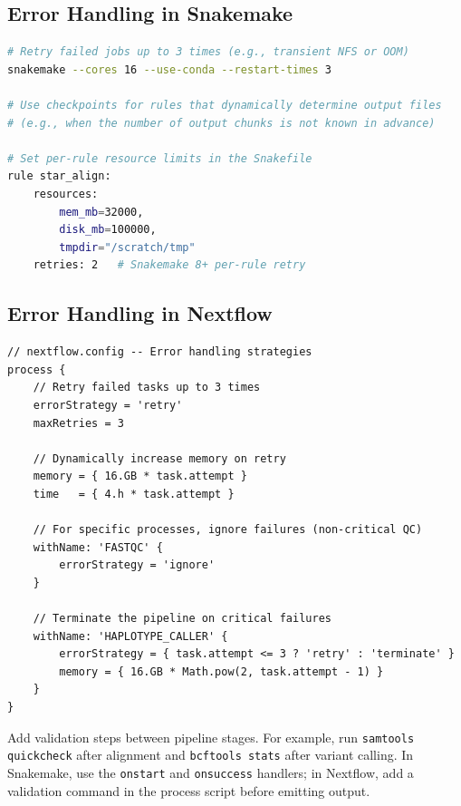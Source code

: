\subsection{Error Handling in Snakemake}

\begin{lstlisting}[language=bash,caption={Snakemake error handling and restart strategies.},label=lst:smk-errorhandling]
# Retry failed jobs up to 3 times (e.g., transient NFS or OOM)
snakemake --cores 16 --use-conda --restart-times 3

# Use checkpoints for rules that dynamically determine output files
# (e.g., when the number of output chunks is not known in advance)

# Set per-rule resource limits in the Snakefile
rule star_align:
    resources:
        mem_mb=32000,
        disk_mb=100000,
        tmpdir="/scratch/tmp"
    retries: 2   # Snakemake 8+ per-rule retry
\end{lstlisting}

\subsection{Error Handling in Nextflow}

\begin{lstlisting}[caption={Nextflow error handling configuration.},label=lst:nf-errorhandling]
// nextflow.config -- Error handling strategies
process {
    // Retry failed tasks up to 3 times
    errorStrategy = 'retry'
    maxRetries = 3

    // Dynamically increase memory on retry
    memory = { 16.GB * task.attempt }
    time   = { 4.h * task.attempt }

    // For specific processes, ignore failures (non-critical QC)
    withName: 'FASTQC' {
        errorStrategy = 'ignore'
    }

    // Terminate the pipeline on critical failures
    withName: 'HAPLOTYPE_CALLER' {
        errorStrategy = { task.attempt <= 3 ? 'retry' : 'terminate' }
        memory = { 16.GB * Math.pow(2, task.attempt - 1) }
    }
}
\end{lstlisting}

\begin{tipbox}[title={Validate Intermediate Files}]
Add validation steps between pipeline stages. For example, run \texttt{samtools quickcheck} after alignment and \texttt{bcftools stats} after variant calling. In Snakemake, use the \texttt{onstart} and \texttt{onsuccess} handlers; in Nextflow, add a validation command in the process script before emitting output.
\end{tipbox}

